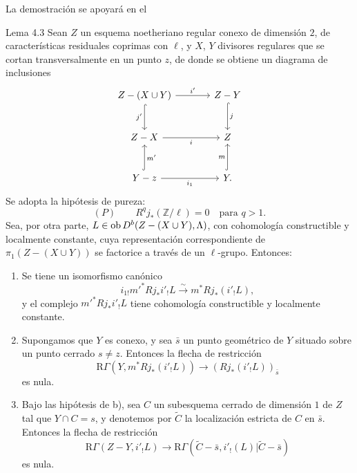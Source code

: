 La demostración se apoyará en el

\begin{statement}{Lema 4.3}
Sean $Z$ un esquema noetheriano regular conexo de dimensión $2$, de características residuales coprimas con $\ell$, y $X$, $Y$ divisores regulares que se cortan transversalmente en un punto $z$, de donde se obtiene un diagrama de inclusiones
\[
\begin{tikzcd}[column sep=large,row sep=large]
Z-(X\cup Y) \arrow[r,"i'"] \arrow[d,hook,"j'"'] & Z-Y \arrow[d,hook,"j"]\\
Z-X \arrow[r,"i"'] & Z\\
Y-z \arrow[r,"i_1"'] \arrow[u,hook,"m'"'] & Y \arrow[u,hook,"m"] .
\end{tikzcd}
\]
Se adopta la hipótesis de pureza:
\[
(P)\qquad R^qj_*(\mathbb Z/\ell)=0\quad\text{para }q>1.
\]
Sea, por otra parte, $L\in\operatorname{ob} D^b(Z-(X\cup Y),\Lambda)$, con cohomología constructible y localmente constante, cuya representación correspondiente de $\pi_1(Z-(X\cup Y))$ se factorice a través de un $\ell$-grupo. Entonces:
\begin{enumerate}[label=\alph*)]
\item Se tiene un isomorfismo canónico
\[
i_{1!}m'^*Rj_*i'_!L\xrightarrow{\sim} m^*Rj_*(i'_!L),
\]
y el complejo $m'^*Rj_*i'_!L$ tiene cohomología constructible y localmente constante.
\item Supongamos que $Y$ es conexo, y sea $\bar s$ un punto geométrico de $Y$ situado sobre un punto cerrado $s\ne z$. Entonces la flecha de restricción
\begin{equation}
\mathrm R\Gamma(Y,m^*Rj_*(i'_!L))\longrightarrow (Rj_*(i'_!L))_{\bar s}
\tag{4.3.1}
\end{equation}
es nula.
\item Bajo las hipótesis de b), sea $C$ un subesquema cerrado de dimensión $1$ de $Z$ tal que $Y\cap C=s$, y denotemos por $\widetilde C$ la localización estricta de $C$ en $\bar s$. Entonces la flecha de restricción
\begin{equation}
\mathrm R\Gamma(Z-Y,i'_!L)
\longrightarrow
\mathrm R\Gamma(\widetilde C-\bar s,i'_!(L)|\widetilde C-\bar s)
\tag{4.3.2}
\end{equation}
es nula.
\end{enumerate}
\end{statement}
